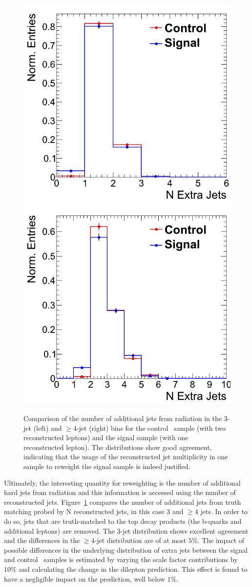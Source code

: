 \begin{figure}[hbt]
  \begin{center}
	\includegraphics[width=0.5\linewidth]{plots/ttdl_njets_presel_3j_comp.png}%
	\includegraphics[width=0.5\linewidth]{plots/ttdl_njets_presel_4j_comp.png}
	\caption{
	  \label{fig:dileptonnjets_signalcontrol_comp}%
          Comparison of the number of additional jets from radiation
          in the 3-jet (left) and $\ge4$-jet (right) bins for the control \ttll\
          sample (with two reconstructed leptons) and the signal
          sample (with one reconstructed lepton). The distributions
          show good agreement, indicating that the usage of the
          reconstructed jet multiplicity in one sample to reweight the
        signal sample is indeed justified.}  
      \end{center}
\end{figure}

Ultimately, the interesting quantity for reweighting is the number of
additional hard jets from radiation and this information is accessed using the
number of reconstructed
jets. Figure~\ref{fig:dileptonnjets_signalcontrol_comp} compares the
number of additional jets from truth matching probed by N
reconstructed jets, in this case 3 and $\ge4$ jets. In order to do so,
jets that are truth-matched to the top decay products (the b-quarks
and additional leptons) are removed. The 3-jet distribution shows 
excellent agreement and the differences in the $\ge4$-jet distribution 
are of at most $5\%$. The impact of possible differences in the
underlying distribution of extra
jets between the signal and control \ttll\ samples is estimated by
varying the scale factor contributions by $10\%$ and calculating the
change in the dilepton prediction. This effect is found to have a
negligible impact on the prediction, well below $1\%$.

